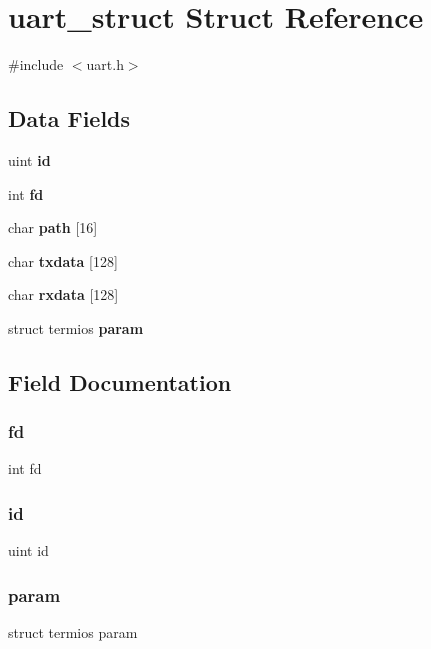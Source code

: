 \section{uart\+\_\+struct Struct Reference}
\label{structuart__struct}


{\ttfamily \#include $<$uart.\+h$>$}

\subsection*{Data Fields}
\begin{DoxyCompactItemize}
\item 
uint \textbf{ id}
\item 
int \textbf{ fd}
\item 
char \textbf{ path} [16]
\item 
char \textbf{ txdata} [128]
\item 
char \textbf{ rxdata} [128]
\item 
struct termios \textbf{ param}
\end{DoxyCompactItemize}


\subsection{Field Documentation}
\mbox{\label{structuart__struct_a6f8059414f0228f0256115e024eeed4b}} 
\subsubsection{fd}
{\footnotesize\ttfamily int fd}

\mbox{\label{structuart__struct_a37e2ea357c25dfa93b154d03c233cd23}} 
\subsubsection{id}
{\footnotesize\ttfamily uint id}

\mbox{\label{structuart__struct_a06038309203b08e180bcf40122e3628f}} 
\subsubsection{param}
{\footnotesize\ttfamily struct termios param}

